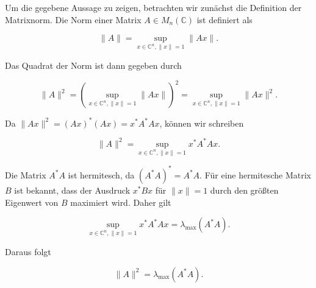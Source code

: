 Um die gegebene Aussage zu zeigen, betrachten wir zunächst die Definition der Matrixnorm. Die Norm einer Matrix \( A \in M_n(\mathbb{C}) \) ist definiert als

\[
\|A\| = \sup_{x \in \mathbb{C}^n, \|x\| = 1} \|Ax\|.
\]

Das Quadrat der Norm ist dann gegeben durch

\[
\|A\|^2 = \left( \sup_{x \in \mathbb{C}^n, \|x\| = 1} \|Ax\| \right)^2 = \sup_{x \in \mathbb{C}^n, \|x\| = 1} \|Ax\|^2.
\]

Da \(\|Ax\|^2 = (Ax)^* (Ax) = x^* A^* A x\), können wir schreiben

\[
\|A\|^2 = \sup_{x \in \mathbb{C}^n, \|x\| = 1} x^* A^* A x.
\]

Die Matrix \(A^* A\) ist hermitesch, da \((A^* A)^* = A^* A\). Für eine hermitesche Matrix \(B\) ist bekannt, dass der Ausdruck \(x^* B x\) für \(\|x\| = 1\) durch den größten Eigenwert von \(B\) maximiert wird. Daher gilt

\[
\sup_{x \in \mathbb{C}^n, \|x\| = 1} x^* A^* A x = \lambda_{\max}(A^* A).
\]

Daraus folgt

\[
\|A\|^2 = \lambda_{\max}(A^* A).
\]

